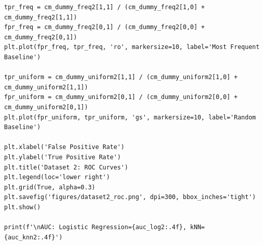 \documentclass[11pt,a4paper]{article}
\begin{document}
\begin{lstlisting}
tpr_freq = cm_dummy_freq2[1,1] / (cm_dummy_freq2[1,0] + cm_dummy_freq2[1,1])
fpr_freq = cm_dummy_freq2[0,1] / (cm_dummy_freq2[0,0] + cm_dummy_freq2[0,1])
plt.plot(fpr_freq, tpr_freq, 'ro', markersize=10, label='Most Frequent Baseline')

tpr_uniform = cm_dummy_uniform2[1,1] / (cm_dummy_uniform2[1,0] + cm_dummy_uniform2[1,1])
fpr_uniform = cm_dummy_uniform2[0,1] / (cm_dummy_uniform2[0,0] + cm_dummy_uniform2[0,1])
plt.plot(fpr_uniform, tpr_uniform, 'gs', markersize=10, label='Random Baseline')

plt.xlabel('False Positive Rate')
plt.ylabel('True Positive Rate')
plt.title('Dataset 2: ROC Curves')
plt.legend(loc='lower right')
plt.grid(True, alpha=0.3)
plt.savefig('figures/dataset2_roc.png', dpi=300, bbox_inches='tight')
plt.show()

print(f'\nAUC: Logistic Regression={auc_log2:.4f}, kNN={auc_knn2:.4f}')
\end{lstlisting}
\end{document}
